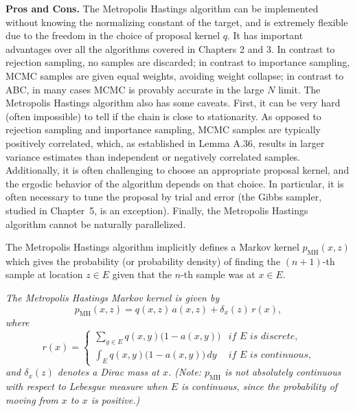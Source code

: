 \medskip
\noindent\textbf{Pros and Cons.}
The Metropolis Hastings algorithm can be implemented without knowing the
normalizing constant of the target, and is extremely flexible due to the freedom in the choice
of proposal kernel $q$. It has important advantages over all the algorithms covered in Chapters
2 and 3. In contrast to rejection sampling, no samples are discarded; in contrast to importance
sampling, MCMC samples are given equal weights, avoiding weight collapse; in contrast
to ABC, in many cases MCMC is provably accurate in the large $N$ limit. The Metropolis
Hastings algorithm also has some caveats. First, it can be very hard (often impossible) to
tell if the chain is close to stationarity. As opposed to rejection sampling and importance
sampling, MCMC samples are typically positively correlated, which, as established in Lemma
A.36, results in larger variance estimates than independent or negatively correlated samples.
Additionally, it is often challenging to choose an appropriate proposal kernel, and the ergodic
behavior of the algorithm depends on that choice. In particular, it is often necessary to tune
the proposal by trial and error (the Gibbs sampler, studied in Chapter~5, is an exception).
Finally, the Metropolis Hastings algorithm cannot be naturally parallelized.

The Metropolis Hastings algorithm implicitly defines a Markov kernel $p_{\mathrm{MH}}(x, z)$ which gives
the probability (or probability density) of finding the $(n+1)$-th sample at location $z \in E$ given
that the $n$-th sample was at $x \in E$.

\begin{lemma}
\label{lem:4.2}
\textit{The Metropolis Hastings Markov kernel is given by}
\[
  p_{\mathrm{MH}}(x, z) = q(x, z)\, a(x, z) + \delta_x(z)\, r(x),
\]
\textit{where}
\[
  r(x) =
  \begin{cases}
    \displaystyle\sum_{y \in E} q(x, y)\bigl(1 - a(x, y)\bigr) & \textit{if } E \textit{ is discrete,}\\[8pt]
    \displaystyle\int_E q(x, y)\bigl(1 - a(x, y)\bigr)\, dy    & \textit{if } E \textit{ is continuous,}
  \end{cases}
\]
\textit{and $\delta_x(z)$ denotes a Dirac mass at $x$. (Note: $p_{\mathrm{MH}}$ is not absolutely continuous with respect to
Lebesgue measure when $E$ is continuous, since the probability of moving from $x$ to $x$ is positive.)}
\end{lemma}


